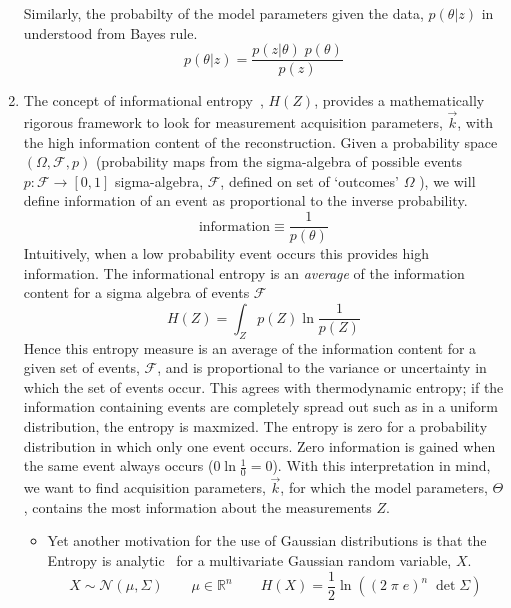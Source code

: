 \documentclass{article}         %
\theoremstyle{definition}
\theoremstyle{remark}
\begin{document}
\begin{enumerate}
\[\]
Similarly, the probabilty of the model parameters given the data,
$p(\theta|z)$ in understood from Bayes rule.
\[
       p(\theta|z) = \frac{ p(z|\theta) \; p(\theta)} {p(z)}
\]
  \item  The concept of informational entropy~\cite{Madankan15}, $H(Z)$,
provides a mathematically rigorous framework to look for measurement acquisition
parameters, $\vec{k}$, with the high information content of the reconstruction.
Given a probability space 
$(\Omega, \mathcal{F},p)$ (probability maps from the
sigma-algebra of possible events $p:\mathcal{F}\rightarrow [0,1]$
sigma-algebra, $\mathcal{F}$, defined on set of `outcomes' $\Omega$
\cite{durrett2010probability}),
we will define information of an event  as
proportional to the inverse probability.
\[
\text{information} \equiv  \frac{1}{p(\theta)}
\]
Intuitively, when a low probability event occurs this provides high
information.
The informational entropy is an \textit{average}
of the information content for a sigma algebra of events $\mathcal{F}$
\[
H(Z) = \int_Z  p(Z) \ln\frac{1}{p(Z)}
\]
Hence this entropy measure is an average of the information content
for a given set of events, $\mathcal{F}$, and is proportional to the
variance or uncertainty in which the set of events occur.
This agrees with thermodynamic entropy;
if the information containing events are completely spread out such as in a
uniform distribution, the entropy is maxmized.
The entropy
is zero for a probability distribution in which
only one event occurs. Zero information is gained when the same event
always occurs ($0 \ln\frac{1}{0} = 0$). 
With this interpretation in mind, we want to find acquisition parameters,
$\vec{k}$, for which the model parameters, $\Theta$, contains the most 
information about the measurements $Z$. 
 


\begin{itemize} 
\item Yet another motivation for the use of Gaussian distributions
is that the Entropy is analytic~\cite{ahmed1989entropy}
for a multivariate Gaussian random variable, $X$.
\begin{equation} \label{GaussianEntropy}
X\sim\mathcal{N}(\mu,\Sigma)
\qquad
\mu \in \mathbb{R}^n
\qquad
H(X) = \frac{1}{2} \ln \left((2 \; \pi \; e)^n  \; \det \Sigma \right) 
\end{equation}


\end{itemize} 


\end{enumerate}
\end{document}
